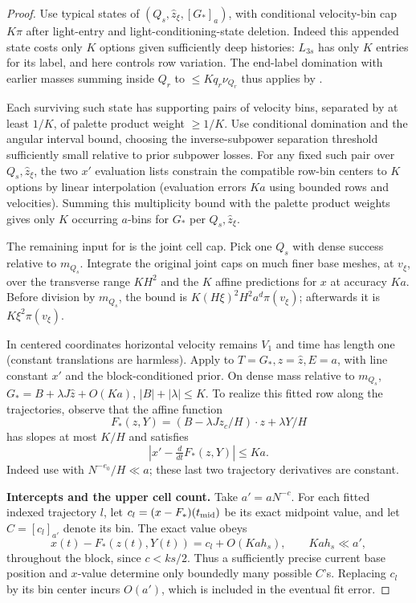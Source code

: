 \begin{proof}
Use typical states of \((Q_s,\widehat z_\xi,[G_*]_a)\), with conditional velocity-bin cap \(K\pi\) after light-entry and light-conditioning-state deletion. Indeed this appended state costs only \(K\) options given sufficiently deep histories: \(L_{3s}\) has only \(K\) entries for its label, and  here controls row variation. The end-label domination with earlier masses summing inside \(Q_r\) to \(\le K q_r\nu_{Q_r}\) thus applies by .

Each surviving such state has supporting pairs of velocity bins, separated by at least \(1/K\), of palette product weight \(\ge1/K\). Use conditional domination and the angular interval bound, choosing the inverse-subpower separation threshold sufficiently small relative to prior subpower losses. For any fixed such pair over \(Q_s,\widehat z_\xi\), the two \(x'\) evaluation lists constrain the compatible row-bin centers to \(K\) options by linear interpolation (evaluation errors \(K a\) using bounded rows and velocities). Summing this multiplicity bound with the palette product weights gives
only \(K\) occurring \(a\)-bins for \(G_*\) per
\(Q_s,\widehat z_\xi\).

The remaining input for  is the joint cell cap.
Pick one \(Q_s\) with dense success relative to \(m_{Q_s}\).
Integrate the original joint caps on much finer base meshes, at
\(v_\xi\), over the transverse range \(K H^2\) and the \(K\)
affine predictions for \(x\) at accuracy \(K a\). Before division
by \(m_{Q_s}\), the bound is \(K(H\xi)^2 H^2 a^d\pi(v_\xi)\);
afterwards it is \(K\xi^2\pi(v_\xi)\).

In centered coordinates horizontal velocity remains \(V_1\) and time has length one (constant translations are harmless). Apply  to \(T=G_*,z=\widehat z,E=a\), with line constant \(x'\) and the block-conditioned prior. On dense mass relative to \(m_{Q_s}\), \(G_*=B+\lambda J\widehat z+O(K a)\), \(|B|+|\lambda|\le K\). To realize this fitted row along the trajectories, observe that the affine function
\[
 F_*(z,Y)=(B-\lambda Jz_c/H)\cdot z+\lambda Y/H
\]
has slopes at most \(K/H\) and satisfies
\[
 |x'-\tfrac{d}{dt}F_*(z,Y)|\le K a.
\]
Indeed use  with \(N^{-e_0}/H\ll a\); these last two trajectory derivatives are constant.

\par\smallskip\noindent\textbf{Intercepts and the upper cell count.}\quad
Take \(a'=aN^{-c}\).  For each fitted indexed trajectory \(l\),
let \(c_l=(x-F_*)(t_{\rm mid})\) be its exact midpoint value,
and let \(C=[c_l]_{a'}\) denote its bin.  The exact value obeys
\[
 x(t)-F_*(z(t),Y(t))=c_l+O(Ka h_s),
 \qquad Ka h_s\ll a',
\]
throughout the block, since \(c<ks/2\).  Thus a sufficiently precise
current base position and \(x\)-value determine only boundedly many
possible \(C\)'s.  Replacing \(c_l\) by its bin center incurs
\(O(a')\), which is included in the eventual fit error.


\end{proof}
